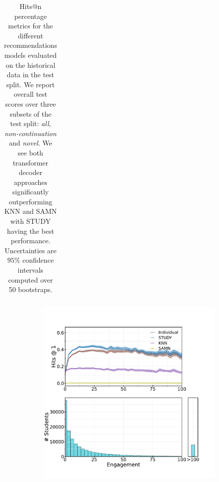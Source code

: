 \documentclass{article}
\begin{document}
\begin{table}[]
\begin{tabular}{c|c|c|c|c|c}
\end{tabular}
    \caption{Hits@n percentage metrics for the different recommendations models evaluated on the historical data in the test split. We report overall test scores over three subsets of the test split: \textit{all}, \textit{non-continuation} and \textit{novel}. We see both transformer decoder approaches significantly outperforming KNN and SAMN with STUDY having the best performance. Uncertainties are $95\%$ confidence intervals computed over 50 bootstraps.}
\label{tab:main_results}

\end{table}


\begin{figure}[]
    \centering
    \begin{subfigure}[]{0.4\linewidth}
        \includegraphics[width=\linewidth]{figures/engagement.pdf}
        \caption{}
    \end{subfigure}
    \begin{subfigure}[]{0.4\linewidth}    

\end{subfigure}
\end{figure}
\end{document}
